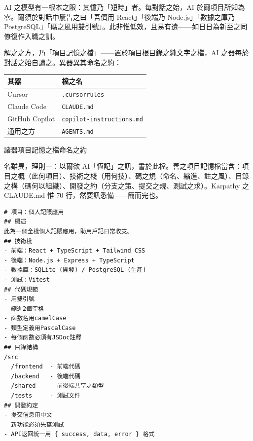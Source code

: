


AI 之模型有一根本之限：其憶乃「短時」者。每對話之始，AI 於爾項目所知為零。爾須於對話中屢告之曰「吾儕用 React」「後端乃 Node.js」「數據之庫乃 PostgreSQL」「碼之風用雙引號」。此非惟低效，且易有遺——如日日為新至之同僚復作入職之訓。

解之之方，乃「項目記憶之檔」——置於項目根目錄之純文字之檔，AI 之器每於對話之始自讀之。異器異其命名之約：

\begin{center}
\begin{tabularx}{\linewidth}{|X|X|}
\hline
\textbf{其器} & \textbf{檔之名} \tabularnewline
\hline
Cursor & \texttt{.\allowbreak cursorrules} \tabularnewline
Claude Code & \texttt{CLAUDE.\allowbreak md} \tabularnewline
GitHub Copilot & \texttt{copilot-\allowbreak instructions.\allowbreak md} \tabularnewline
通用之方 & \texttt{AGENTS.\allowbreak md} \tabularnewline
\hline
\end{tabularx}
\end{center}

\begin{center}\small\color{gray}諸器項目記憶之檔命名之約\end{center}

名雖異，理則一：以爾欲 AI「恆記」之訊，書於此檔。善之項目記憶檔當含：項目之概（此何項目）、技術之棧（用何技）、碼之規（命名、縮進、註之風）、目錄之構（碼何以組織）、開發之約（分支之策、提交之規、測試之求）。Karpathy 之 CLAUDE.md 惟 70 行，然要訊悉備——簡而完也。

\begin{lstlisting}
# 項目：個人記賬應用
## 概述
此為一個全棧個人記賬應用，助用戶記日常收支。
## 技術棧
- 前端：React + TypeScript + Tailwind CSS
- 後端：Node.js + Express + TypeScript
- 數據庫：SQLite (開發) / PostgreSQL (生產)
- 測試：Vitest
## 代碼規範
- 用雙引號
- 縮進2個空格
- 函數名用camelCase
- 類型定義用PascalCase
- 每個函數必須有JSDoc註釋
## 目錄結構
/src
  /frontend  - 前端代碼
  /backend   - 後端代碼
  /shared    - 前後端共享之類型
  /tests     - 測試文件
## 開發約定
- 提交信息用中文
- 新功能必須先寫測試
- API返回統一用 { success, data, error } 格式
\end{lstlisting}

